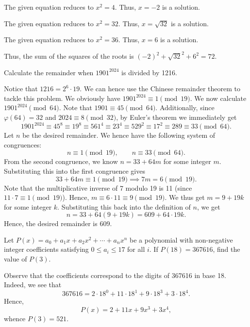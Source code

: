  The given equation reduces to $x^2 = 4$. Thus, $x = -2$ is a solution.

 The given equation reduces to $x^2 = 32$. Thus, $x = \sqrt{32}$ is a solution.

 The given equation reduces to $x^2 = 36$. Thus, $x = 6$ is a solution.

Thus, the sum of the squares of the roots is $(-2)^2 + \sqrt{32}^2 + 6^2 = 72$.


\begin{question}[609]\label{A::2024-S-1-20}
    Calculate the remainder when $1901^{2024}$ is divided by 1216.
\end{question}

Notice that $1216 = 2^6 \cdot 19$. We can hence use the Chinese remainder theorem to tackle this problem. We obviously have $1901^{2024} \equiv 1 \pmod{19}$. We now calculate $1901^{2024} \pmod{64}$. Note that $1901 \equiv 45 \pmod{64}$. Additionally, since $\varphi(64) = 32$ and $2024 \equiv 8 \pmod{32}$, by Euler's theorem we immediately get \[1901^{2024} \equiv 45^8 \equiv 19^8 \equiv 561^4 \equiv 23^4 \equiv 529^2 \equiv 17^2 \equiv 289 \equiv 33  \pmod{64}.\] Let $n$ be the desired remainder. We hence have the following system of congruences: \[n \equiv 1 \pmod{19}, \qquad n \equiv 33 \pmod{64}.\] From the second congruence, we know $n = 33 + 64m$ for some integer $m$. Substituting this into the first congruence gives \[33 + 64m \equiv 1 \pmod{19} \implies 7m = 6 \pmod{19}.\] Note that the multiplicative inverse of 7 modulo 19 is 11 (since $11 \cdot 7 \equiv 1 \pmod{19}$). Hence, $m \equiv 6 \cdot 11 \equiv 9 \pmod{19}$. We thus get $m = 9 + 19k$ for some integer $k$. Substituting this back into the definition of $n$, we get \[n = 33 + 64(9 + 19k) = 609 + 64 \cdot 19k.\] Hence, the desired remainder is 609.

\begin{question}[521]\label{A::2024-S-1-21}
    Let $P(x) = a_0 + a_1 x + a_2 x^2 + \cdots + a_n x^n$ be a polynomial with non-negative integer coefficients satisfying $0 \leq a_i \leq 17$ for all $i$. If $P(18) = 367616$, find the value of $P(3)$.
\end{question}

Observe that the coefficients correspond to the digits of 367616 in base 18. Indeed, we see that \[367616 = 2 \cdot 18^0 + 11 \cdot 18^1 + 9 \cdot 18^3 + 3 \cdot 18^4.\] Hence, \[P(x) = 2 + 11x + 9x^3 + 3x^4,\] whence $P(3) = 521$.

